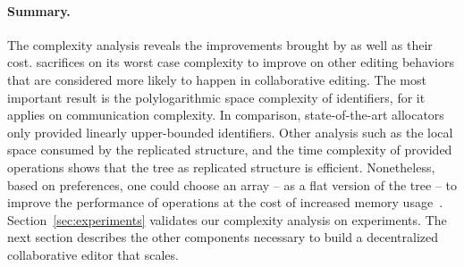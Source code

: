 
\paragraph{Summary.}

The complexity analysis reveals the improvements brought by \LSEQ as well as
their cost.  \LSEQ sacrifices on its worst case complexity to improve on other
editing behaviors that are considered more likely to happen in collaborative
editing. The most important result is the polylogarithmic space complexity of
identifiers, for it applies on communication complexity. In comparison,
state-of-the-art allocators~\cite{preguica2009commutative, weiss2009logoot} only
provided linearly upper-bounded identifiers. Other analysis such as the local
space consumed by the replicated structure, and the time complexity of provided
operations shows that the tree as replicated structure is
efficient. Nonetheless, based on preferences, one could choose an array -- as a
flat version of the tree -- to improve the performance of operations at the cost
of increased memory usage~\cite{weiss2009logoot}.  Section~\ref{sec:experiments}
validates our complexity analysis on experiments. The next section describes the
other components necessary to build a decentralized collaborative editor that
scales.

